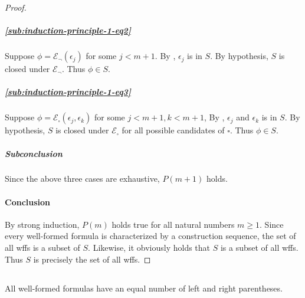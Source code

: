\documentclass{report}
\begin{document}
\begin{proof}
      \subparagraph{\eqref{sub:induction-principle-1-eq2}}%

        Suppose $\phi = \mathcal{E}_\neg(\epsilon_j)$ for some $j < m + 1$.
        By , $\epsilon_j$ is in $S$.
        By hypothesis, $S$ is closed under $\mathcal{E}_\neg$.
        Thus $\phi \in S$.

      \subparagraph{\eqref{sub:induction-principle-1-eq3}}%

        Suppose $\phi = \mathcal{E}_\square(\epsilon_j, \epsilon_k)$ for some
          $j < m + 1, k < m + 1$,
        By , $\epsilon_j$ and $\epsilon_k$
          is in $S$.
        By hypothesis, $S$ is closed under $\mathcal{E}_\square$ for all
          possible candidates of $\square$.
        Thus $\phi \in S$.

      \subparagraph{Subconclusion}%

        Since the above three cases are exhaustive, $P(m + 1)$ holds.

    \paragraph{Conclusion}%

      By strong induction, $P(m)$ holds true for all natural numbers $m \geq 1$.
      Since every well-formed formula is characterized by a construction
        sequence, the set of all wffs is a subset of $S$.
      Likewise, it obviously holds that $S$ is a subset of all wffs.
      Thus $S$ is precisely the set of all wffs.

  \end{proof}

\subsection{}%

  \begin{lemma}
    All well-formed formulas have an equal number of left and right parentheses.
  \end{lemma}
\end{document}
